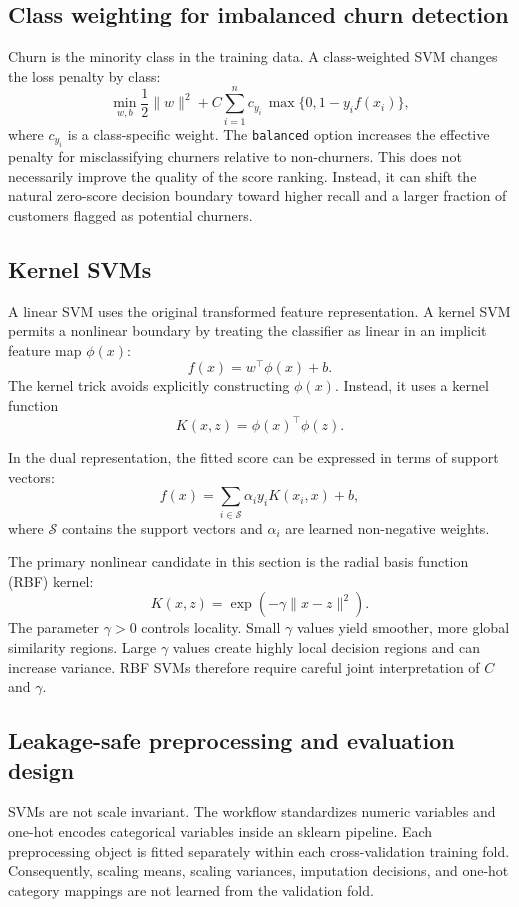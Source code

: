 \subsection{Class weighting for imbalanced churn detection}

Churn is the minority class in the training data. A class-weighted SVM changes the loss penalty by class:
\[
\min_{w,b}
\frac{1}{2}\lVert w\rVert^2
+
C\sum_{i=1}^{n}
c_{y_i}\,
\max\{0,1-y_i f(x_i)\},
\]
where \(c_{y_i}\) is a class-specific weight. The \texttt{balanced} option increases the effective penalty for misclassifying churners relative to non-churners. This does not necessarily improve the quality of the score ranking. Instead, it can shift the natural zero-score decision boundary toward higher recall and a larger fraction of customers flagged as potential churners.

\subsection{Kernel SVMs}

A linear SVM uses the original transformed feature representation. A kernel SVM permits a nonlinear boundary by treating the classifier as linear in an implicit feature map \(\phi(x)\):
\[
f(x)
=
w^\top \phi(x) + b.
\]
The kernel trick avoids explicitly constructing \(\phi(x)\). Instead, it uses a kernel function
\[
K(x,z)=\phi(x)^\top\phi(z).
\]

In the dual representation, the fitted score can be expressed in terms of support vectors:
\[
f(x)
=
\sum_{i\in\mathcal{S}}
\alpha_i y_i K(x_i,x)
+
b,
\]
where \(\mathcal{S}\) contains the support vectors and \(\alpha_i\) are learned non-negative weights.

The primary nonlinear candidate in this section is the radial basis function (RBF) kernel:
\[
K(x,z)
=
\exp\left(-\gamma\lVert x-z\rVert^2\right).
\]
The parameter \(\gamma>0\) controls locality. Small \(\gamma\) values yield smoother, more global similarity regions. Large \(\gamma\) values create highly local decision regions and can increase variance. RBF SVMs therefore require careful joint interpretation of \(C\) and \(\gamma\).

\subsection{Leakage-safe preprocessing and evaluation design}

SVMs are not scale invariant. The workflow standardizes numeric variables and one-hot encodes categorical variables inside an sklearn pipeline. Each preprocessing object is fitted separately within each cross-validation training fold. Consequently, scaling means, scaling variances, imputation decisions, and one-hot category mappings are not learned from the validation fold.


